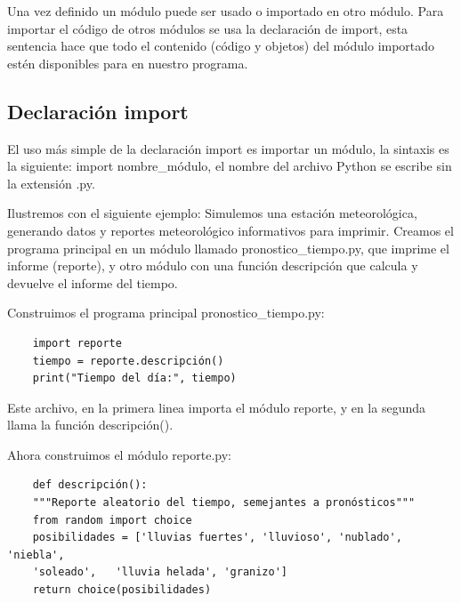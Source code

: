 Una vez definido un módulo puede ser usado o importado en otro módulo. Para importar el código de otros módulos se usa la declaración de {\ttfamily import}, esta sentencia hace que todo el contenido (código y objetos) del módulo importado estén disponibles para en nuestro programa. 


\subsection{Declaración {\ttfamily import}}

El uso más simple de la declaración {\ttfamily import} es importar un módulo, la sintaxis es la siguiente: {\ttfamily import nombre\_módulo}, el nombre del archivo Python se escribe sin la extensión {\ttfamily .py}. 

Ilustremos con el siguiente ejemplo: Simulemos una estación meteorológica, generando datos y reportes meteorológico informativos para imprimir. Creamos el programa principal en un módulo llamado {\ttfamily pronostico\_tiempo.py}, que imprime el informe (reporte), y  otro módulo con una función {\ttfamily descripción} que calcula y devuelve el informe del tiempo.

Construimos el programa principal {\ttfamily pronostico\_tiempo.py}:

\hspace{-2.7cm}{\ttfamily \scriptsize pronostico}

\vspace{-0.2cm}
\hspace{-2.3cm}{\ttfamily \scriptsize \_tiempo.py}\vspace{-0.84cm}
\begin{lstlisting}
	import reporte
	tiempo = reporte.descripción()
	print("Tiempo del día:", tiempo)
\end{lstlisting}
Este archivo, en la primera linea importa el módulo {\ttfamily reporte}, y en la segunda llama la función {\ttfamily descripción()}.

Ahora construimos el módulo {\ttfamily reporte.py}: 

\hspace{-2.3cm}{\ttfamily \scriptsize reporte.py}  \vspace{-0.52cm}
\begin{lstlisting}
	def descripción(): 
	"""Reporte aleatorio del tiempo, semejantes a pronósticos"""
	from random import choice
	posibilidades = ['lluvias fuertes', 'lluvioso', 'nublado', 'niebla',
	'soleado',   'lluvia helada', 'granizo']
	return choice(posibilidades) 
\end{lstlisting}

